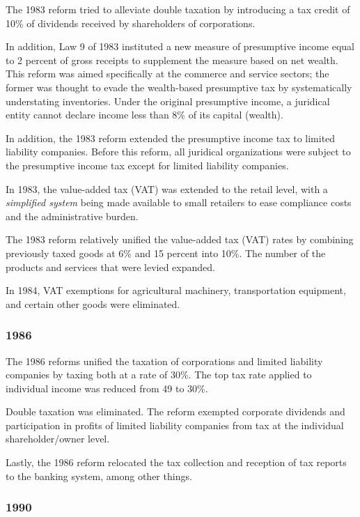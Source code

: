 \documentclass[
  12pt]{article}
\theoremstyle{definition}
\theoremstyle{remark}
\begin{document}
The 1983 reform tried to alleviate double taxation by introducing a tax
credit of 10\% of dividends received by shareholders of corporations.

In addition, Law 9 of 1983 instituted a new measure of presumptive
income equal to 2 percent of gross receipts to supplement the measure
based on net wealth. This reform was aimed specifically at the commerce
and service sectors; the former was thought to evade the wealth-based
presumptive tax by systematically understating inventories. Under the
original presumptive income, a juridical entity cannot declare income
less than 8\% of its capital (wealth).

In addition, the 1983 reform extended the presumptive income tax to
limited liability companies. Before this reform, all juridical
organizations were subject to the presumptive income tax except for
limited liability companies.

In 1983, the value-added tax (VAT) was extended to the retail level,
with a \emph{simplified system} being made available to small retailers
to ease compliance costs and the administrative burden.

The 1983 reform relatively unified the value-added tax (VAT) rates by
combining previously taxed goods at 6\% and 15 percent into 10\%. The
number of the products and services that were levied expanded.

In 1984, VAT exemptions for agricultural machinery, transportation
equipment, and certain other goods were eliminated.

\subsubsection{1986}\label{section-1}

The 1986 reforms unified the taxation of corporations and limited
liability companies by taxing both at a rate of 30\%. The top tax rate
applied to individual income was reduced from 49 to 30\%.

Double taxation was eliminated. The reform exempted corporate dividends
and participation in profits of limited liability companies from tax at
the individual shareholder/owner level.

Lastly, the 1986 reform relocated the tax collection and reception of
tax reports to the banking system, among other things.

\subsubsection{1990}\label{section-2}
\end{document}
